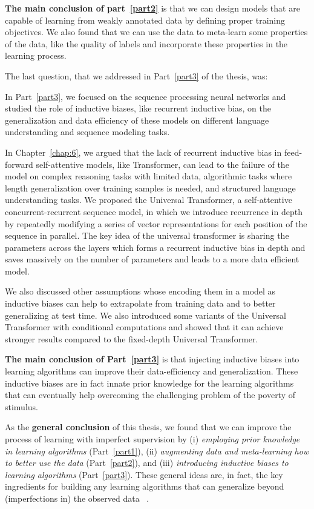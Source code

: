 \textbf{The main conclusion of part~\ref{part2}} is that we can design models that are capable of learning from weakly annotated data by defining proper training objectives. We also found that we can use the data to meta-learn some properties of the data, like the quality of labels and incorporate these properties in the learning process.

\bigskip
The last question, that we addressed in Part~\ref{part3} of the thesis, was:
%

In Part~\ref{part3}, we focused on the sequence processing neural networks and studied the role of inductive biases, like recurrent inductive bias, on the generalization and data efficiency of these models on different language understanding and sequence modeling tasks.

In Chapter~\ref{chap:6}, we argued that the lack of recurrent inductive bias in feed-forward self-attentive models, like Transformer, can lead to the failure of the model on complex reasoning tasks with limited data, algorithmic tasks where length generalization over training samples is needed, and structured language understanding tasks. We proposed the Universal Transformer, a self-attentive concurrent-recurrent sequence model, in which we introduce recurrence in depth by repeatedly modifying a series of vector representations for each position of the sequence in parallel. The key idea of the universal transformer is sharing the parameters across the layers which forms a recurrent inductive bias in depth and saves massively on the number of parameters and leads to a more data efficient model. 

We also discussed other assumptions whose encoding them in a model as inductive biases can help to extrapolate from training data and to better generalizing at test time.  We also introduced some variants of the Universal Transformer with conditional computations and showed that it can achieve stronger results compared to the fixed-depth Universal Transformer.

\textbf{The main conclusion of Part~\ref{part3}} is that injecting inductive biases into learning algorithms can improve their data-efficiency and generalization. These inductive biases are in fact innate prior knowledge for the learning algorithms that can eventually help overcoming the challenging problem of the poverty of stimulus.

\bigskip
As the \textbf{general conclusion} of this thesis, we found that we can improve the process of learning with imperfect supervision by (i) \emph{employing  prior knowledge in learning algorithms} (Part~\ref{part1}), (ii) \emph{augmenting data and meta-learning how to better use the data} (Part~\ref{part2}), and (iii) \emph{introducing inductive biases to learning algorithms} (Part~\ref{part3}). 
%
These general ideas are, in fact, the key ingredients for building any learning algorithms that can generalize beyond (imperfections in) the observed data ~\citep{Mitchell80theneed}.

